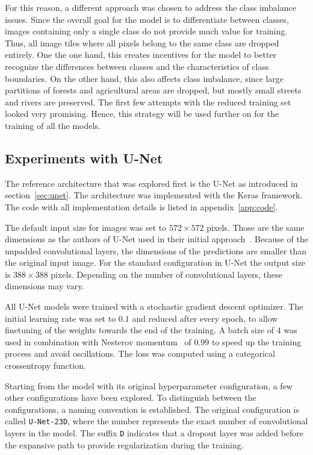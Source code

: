 For this reason, a different approach was chosen to address the class imbalance issues. Since the overall goal for the model is to differentiate between classes, images containing only a single class do not provide much value for training. Thus, all image tiles where all pixels belong to the same class are dropped entirely. One the one hand, this creates incentives for the model to better recognize the differences between classes and the characteristics of class boundaries. On the other hand, this also affects class imbalance, since large partitions of forests and agricultural areas are dropped, but mostly small streets and rivers are preserved. The first few attempts with the reduced training set looked    very promising. Hence, this strategy will be used further on for the training of all the models.


\subsection{Experiments with U-Net}
\label{sec:unet_experiments}
The reference architecture that was explored first is the U-Net as introduced in section~\ref{sec:unet}. The architecture was implemented with the Keras framework. The code with all implementation details is listed in appendix~\ref{app:code}.

The default input size for images was set to $572\times 572$ pixels. Those are the same dimensions as the authors of U-Net used in their initial approach~\cite{unet15}. Because of the unpadded convolutional layers, the dimensions of the predictions are smaller than the original input image. For the standard configuration in U-Net the output size is $388\times 388$ pixels. Depending on the number of convolutional layers, these dimensions may vary.

All U-Net models were trained with a stochastic gradient descent optimizer. The initial learning rate was set to $0.1$ and reduced after every epoch, to allow finetuning of the weights towards the end of the training. A batch size of $4$ was used in combination with Nesterov momentum~\cite{nesterov83} of $0.99$ to speed up the training process and avoid oscillations. The loss was computed using a categorical crossentropy function.

Starting from the model with its original hyperparameter configuration, a few other configurations have been explored. To distinguish between the configurations, a naming convention is established. The original configuration is called \texttt{U-Net-23D}, where the number represents the exact number of convolutional layers in the model. The suffix \texttt{D} indicates that a dropout layer was added before the expansive path to provide regularization during the training.

